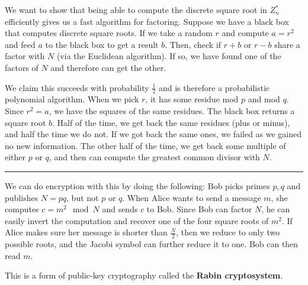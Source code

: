 \documentclass[twoside]{article}
\newenvironment{proof}{{\bf Proof:}}{\hfill\rule{2mm}{2mm}}
\begin{document}
\begin{proof}
	We want to show that being able to compute the discrete square root in $Z_n^*$ efficiently gives us a fast algorithm for factoring.  Suppose we have a black box that computes discrete square roots.  If we take a random $r$ and compute $a=r^2$ and feed $a$ to the black box to get a result $b$.  Then, check if $r+b$ or $r-b$ share a factor with $N$ (via the Euclidean algorithm).  If so, we have found one of the factors of $N$ and therefore can get the other.
	
	We claim this succeeds with probability $\frac{1}{2}$ and is therefore a probabilistic polynomial algorithm.  When we pick $r$, it has some residue mod $p$ and mod $q$.  Since $r^2=a$, we have the squares of the same residues.  The black box returns a square root $b$.  Half of the time, we get back the same residues (plus or minus), and half the time we do not.  If we got back the same ones, we failed as we gained no new information.  The other half of the time, we get back some multiple of either $p$ or $q$, and then can compute the greatest common divisor with $N$.
\end{proof}

We can do encryption with this by doing the following: Bob picks primes $p,q$ and publishes $N=pq$, but not $p$ or $q$.  When Alice wants to send a message $m$, she computes $c=m^2\mod N$ and sends $c$ to Bob.  Since Bob can factor $N$, he can easily invert the computation and recover one of the four square roots of $m^2$.  If Alice makes sure her message is shorter than $\frac{N}{2}$, then we reduce to only two possible roots, and the Jacobi symbol can further reduce it to one.  Bob can then read $m$.

This is a form of public-key cryptography called the \textbf{Rabin cryptosystem}.


 
\end{document}
